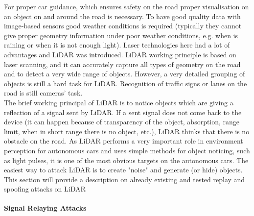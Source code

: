 For proper car guidance, which ensures safety on the road proper visualisation on an object on and around the road is necessary. To have good quality data with image-based sensors good weather conditions is required (typically they cannot give proper geometry information under poor weather conditions, e.g. when is raining or when it is not enough light). Laser technologies here had a lot of advantages and \gls{LiDAR} was introduced. \gls{LiDAR} working principle is based on laser scanning, and it can accurately capture all types of geometry on the road and to detect a very wide range of objects. However, a very detailed grouping of objects is still a hard task for \gls{LiDAR}. Recognition of traffic signs or lanes on the road is still cameras' task. \\
The brief working principal of \gls{LiDAR} is to notice objects which are giving a reflection of a signal sent by \gls{LiDAR}. If a sent signal does not come back to the device (it can happen because of transparency of the object, absorption, range limit, when in short range there is no object, etc.), \gls{LiDAR} thinks that there is no obstacle on the road. As \gls{LiDAR} performs a very important role in environment perception for autonomous cars and uses simple methods for object noticing, such as light pulses, it is one of the most obvious targets on the autonomous cars. The easiest way to attack \gls{LiDAR} is to create "noise" and generate (or hide) objects. This section will provide a description on already existing and tested replay and spoofing \cite{AttacksOnSensors} attacks on \gls{LiDAR}

\paragraph{Signal Relaying Attacks}


